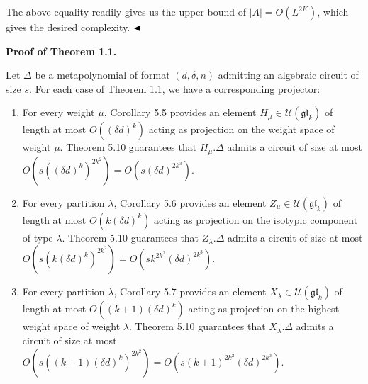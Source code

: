 The above equality readily gives us the upper bound of $|A|=O(L^{2K})$, which gives the desired complexity.
$\hfill\blacktriangleleft$






\par\medskip\noindent\textbf{Proof of Theorem 1.1.}\par




Let $\Delta$ be a metapolynomial of format $(d,\delta,n)$ admitting an algebraic circuit of size $s$. For each case of Theorem 1.1, we have a corresponding projector:



\begin{enumerate}


\item 
 


For every weight $\mu$, Corollary 5.5 provides an element $H_{\mu}\in\mathcal{U}(\mathfrak{gl}_{k})$ of length at most $O((\delta d)^{k})$ acting as projection on the weight space of weight $\mu$. Theorem 5.10 guarantees that $H_{\mu}.\Delta$ admits a circuit of size at most $O(s((\delta d)^{k})^{2k^{2}})=O(s(\delta d)^{2k^{3}})$.





\item 
 


For every partition $\lambda$, Corollary 5.6 provides an element $Z_{\mu}\in\mathcal{U}(\mathfrak{gl}_{k})$ of length at most $O(k(\delta d)^{k})$ acting as projection on the isotypic component of type $\lambda$. Theorem 5.10 guarantees that $Z_{\lambda}.\Delta$ admits a circuit of size at most $O(s(k(\delta d)^{k})^{2k^{2}})=O(sk^{2k^{2}}(\delta d)^{2k^{3}})$.





\item 
 


For every partition $\lambda$, Corollary 5.7 provides an element $X_{\lambda}\in\mathcal{U}(\mathfrak{gl}_{k})$ of length at most $O((k+1)(\delta d)^{k})$ acting as projection on the highest weight space of weight $\lambda$. Theorem 5.10 guarantees that $X_{\lambda}.\Delta$ admits a circuit of size at most $O(s((k+1)(\delta d)^{k})^{2k^{2}})=O(s(k+1)^{2k^{2}}(\delta d)^{2k^{3}})$.






\end{enumerate}
